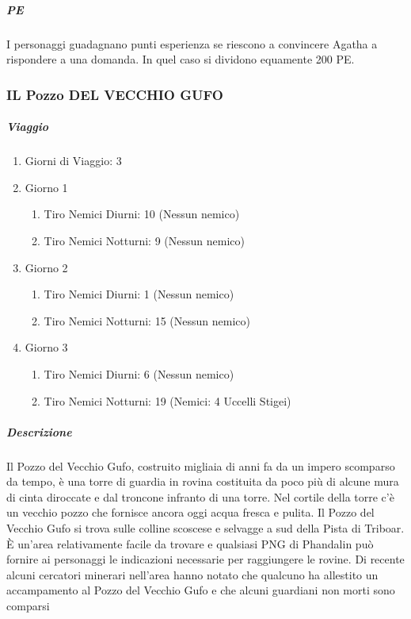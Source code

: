 \documentclass{article}
\begin{document}
\subparagraph{PE}I personaggi guadagnano punti esperienza se riescono a
convincere Agatha a rispondere a una domanda. In quel caso
si dividono equamente 200 PE.

\subsubsection{IL Pozzo DEL VECCHIO GUFO}
 \subparagraph{Viaggio} \begin{enumerate}
        \item Giorni di Viaggio: 3
        \item Giorno 1
                \begin{enumerate}
                    \item Tiro Nemici Diurni: 10 (Nessun nemico)
                    \item Tiro Nemici Notturni: 9 (Nessun nemico)
                \end{enumerate}
         \item Giorno 2
                \begin{enumerate}
                    \item Tiro Nemici Diurni: 1 (Nessun nemico)
                    \item Tiro Nemici Notturni: 15 (Nessun nemico)
                \end{enumerate}
         \item Giorno 3
                \begin{enumerate}
                    \item Tiro Nemici Diurni: 6 (Nessun nemico)
                    \item Tiro Nemici Notturni: 19 (Nemici: 4 Uccelli Stigei)
                \end{enumerate}
    \end{enumerate}
\subparagraph{Descrizione}
Il Pozzo del Vecchio Gufo, costruito migliaia di anni fa da
un impero scomparso da tempo, è una torre di guardia in
rovina costituita da poco più di alcune mura di cinta diroccate
e dal troncone infranto di una torre. Nel cortile della torre
c'è un vecchio pozzo che fornisce ancora oggi acqua fresca
e pulita. Il Pozzo del Vecchio Gufo si trova sulle colline
scoscese e selvagge a sud della Pista di Triboar. È un’area
relativamente facile da trovare e qualsiasi PNG di Phandalin
può fornire ai personaggi le indicazioni necessarie per
raggiungere le rovine.
Di recente alcuni cercatori minerari nell’area hanno notato
che qualcuno ha allestito un accampamento al Pozzo del
Vecchio Gufo e che alcuni guardiani non morti sono comparsi
\end{document}
